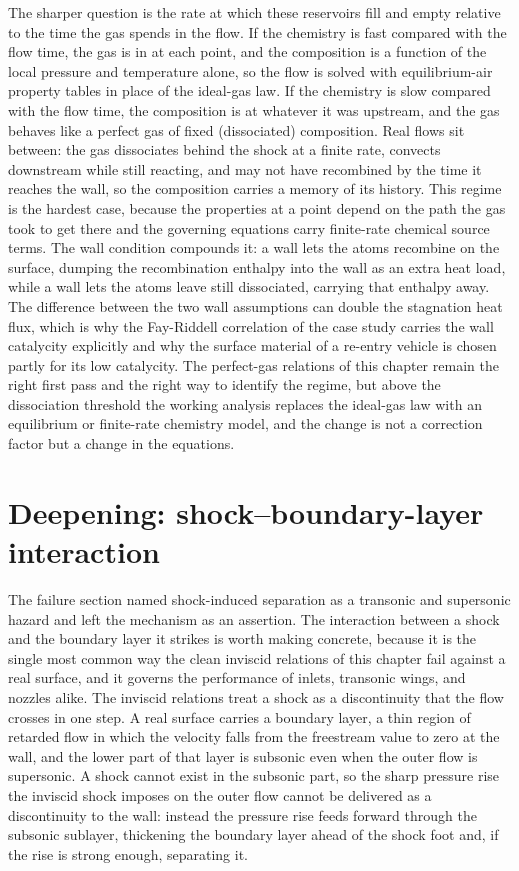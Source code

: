 The sharper question is the rate at which these reservoirs fill and
empty relative to the time the gas spends in the flow. If the chemistry
is fast compared with the flow time, the gas is in 
at each point, and the composition is a function of the local pressure
and temperature alone, so the flow is solved with equilibrium-air
property tables in place of the ideal-gas law. If the chemistry is slow
compared with the flow time, the composition is  at
whatever it was upstream, and the gas behaves like a perfect gas of
fixed (dissociated) composition. Real flows sit between: the gas
dissociates behind the shock at a finite rate, convects downstream while
still reacting, and may not have recombined by the time it reaches the
wall, so the composition carries a memory of its history. This
 regime is the hardest case, because the
properties at a point depend on the path the gas took to get there and
the governing equations carry finite-rate chemical source terms. The
wall condition compounds it: a  wall lets the atoms
recombine on the surface, dumping the recombination enthalpy into the
wall as an extra heat load, while a  wall lets
the atoms leave still dissociated, carrying that enthalpy away. The
difference between the two wall assumptions can double the stagnation
heat flux, which is why the Fay-Riddell correlation of the case study
carries the wall catalycity explicitly and why the surface material of a
re-entry vehicle is chosen partly for its low catalycity. The
perfect-gas relations of this chapter remain the right first pass and
the right way to identify the regime, but above the dissociation
threshold the working analysis replaces the ideal-gas law with an
equilibrium or finite-rate chemistry model, and the change is not a
correction factor but a change in the equations.

\section{Deepening: shock--boundary-layer interaction}

The failure section named shock-induced separation as a transonic and
supersonic hazard and left the mechanism as an assertion. The
interaction between a shock and the boundary layer it strikes is worth
making concrete, because it is the single most common way the clean
inviscid relations of this chapter fail against a real surface, and it
governs the performance of inlets, transonic wings, and nozzles alike.
The inviscid relations treat a shock as a discontinuity that the flow
crosses in one step. A real surface carries a boundary layer, a thin
region of retarded flow in which the velocity falls from the freestream
value to zero at the wall, and the lower part of that layer is subsonic
even when the outer flow is supersonic. A shock cannot exist in the
subsonic part, so the sharp pressure rise the inviscid shock imposes on
the outer flow cannot be delivered as a discontinuity to the wall:
instead the pressure rise feeds forward through the subsonic sublayer,
thickening the boundary layer ahead of the shock foot and, if the rise
is strong enough, separating it.

